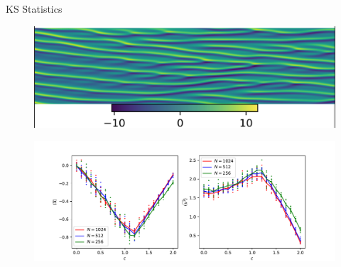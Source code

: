 \documentclass[aspectratio=169]{beamer}
\begin{document}

 
        


\begin{frame}{KS Statistics}
	\begin{figure}[ht] 
		\centering 
		\includegraphics[width=.6\textwidth]{fig/ks.jpg} 
		\label{fig:stats}
	\end{figure}
	\begin{figure}[ht] 
		\centering 
		\includegraphics[width=.8\textwidth]{fig/ks_c_stats.pdf} 
		\label{fig:stats}
	\end{figure}
\end{frame}
\end{document}
